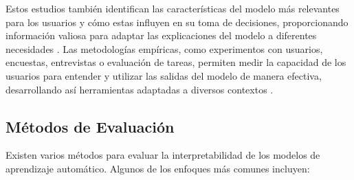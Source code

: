 Estos estudios también identifican las características del modelo más relevantes para los usuarios y cómo estas influyen en su toma de decisiones, proporcionando información valiosa para adaptar las explicaciones del modelo a diferentes necesidades \cite{ribeiro2016should}. Las metodologías empíricas, como experimentos con usuarios, encuestas, entrevistas o evaluación de tareas, permiten medir la capacidad de los usuarios para entender y utilizar las salidas del modelo de manera efectiva, desarrollando así herramientas adaptadas a diversos contextos \cite{doshi2017towards}.

\subsection{Métodos de Evaluación}

Existen varios métodos para evaluar la interpretabilidad de los modelos de aprendizaje automático. Algunos de los enfoques más comunes incluyen:

